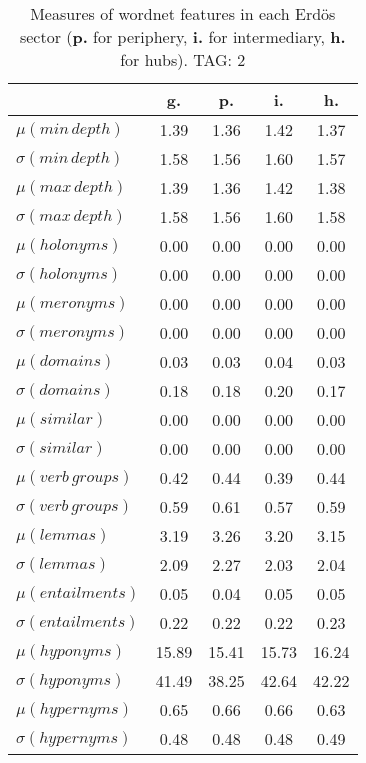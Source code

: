 \begin{table}[h!]
\begin{center}
\begin{tabular}{| l | c | c | c | c |}\hline
 & g. & p. & i. & h. \\\hline
$\mu(min\,depth)$ & 1.39  & 1.36  & 1.42  & 1.37 \\\hline
$\sigma(min\,depth)$ & 1.58  & 1.56  & 1.60  & 1.57 \\\hline
$\mu(max\,depth)$ & 1.39  & 1.36  & 1.42  & 1.38 \\\hline
$\sigma(max\,depth)$ & 1.58  & 1.56  & 1.60  & 1.58 \\\hline
$\mu(holonyms)$ & 0.00  & 0.00  & 0.00  & 0.00 \\\hline
$\sigma(holonyms)$ & 0.00  & 0.00  & 0.00  & 0.00 \\\hline
$\mu(meronyms)$ & 0.00  & 0.00  & 0.00  & 0.00 \\\hline
$\sigma(meronyms)$ & 0.00  & 0.00  & 0.00  & 0.00 \\\hline
$\mu(domains)$ & 0.03  & 0.03  & 0.04  & 0.03 \\\hline
$\sigma(domains)$ & 0.18  & 0.18  & 0.20  & 0.17 \\\hline
$\mu(similar)$ & 0.00  & 0.00  & 0.00  & 0.00 \\\hline
$\sigma(similar)$ & 0.00  & 0.00  & 0.00  & 0.00 \\\hline
$\mu(verb\,groups)$ & 0.42  & 0.44  & 0.39  & 0.44 \\\hline
$\sigma(verb\,groups)$ & 0.59  & 0.61  & 0.57  & 0.59 \\\hline
$\mu(lemmas)$ & 3.19  & 3.26  & 3.20  & 3.15 \\\hline
$\sigma(lemmas)$ & 2.09  & 2.27  & 2.03  & 2.04 \\\hline
$\mu(entailments)$ & 0.05  & 0.04  & 0.05  & 0.05 \\\hline
$\sigma(entailments)$ & 0.22  & 0.22  & 0.22  & 0.23 \\\hline
$\mu(hyponyms)$ & 15.89  & 15.41  & 15.73  & 16.24 \\\hline
$\sigma(hyponyms)$ & 41.49  & 38.25  & 42.64  & 42.22 \\\hline
$\mu(hypernyms)$ & 0.65  & 0.66  & 0.66  & 0.63 \\\hline
$\sigma(hypernyms)$ & 0.48  & 0.48  & 0.48  & 0.49 \\\hline
\end{tabular}
\caption{Measures of wordnet features in each Erd\"os sector ({{\bf p.}} for periphery, {{\bf i.}} for intermediary, {{\bf h.}} for hubs). TAG: 2}
\end{center}
\end{table}